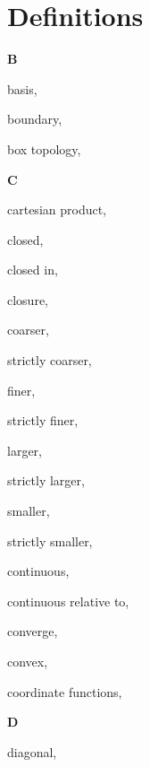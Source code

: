 \section*{Definitions}

\begin{multicols}{2}

\vspace{1em}\noindent\large{\textbf{B}}

basis, \pageref{def:Basis}

boundary, \pageref{def:Boundary}

box topology, \pageref{def:BoxTopology}

\vspace{1em}\noindent\large{\textbf{C}}

cartesian product, \pageref{def:CartesianProduct}

closed, \pageref{def:Closed}

\hspace{1em}closed in, \pageref{def:ClosedIn}

closure, \pageref{def:Closure}

coarser, \pageref{def:Comparable}

\hspace{1em}strictly coarser, \pageref{def:Comparable}

finer, \pageref{def:Comparable}

\hspace{1em}strictly finer, \pageref{def:Comparable}

larger, \pageref{def:Comparable}

\hspace{1em}strictly larger, \pageref{def:Comparable}

smaller, \pageref{def:Comparable}

\hspace{1em}strictly smaller, \pageref{def:Comparable}

continuous, \pageref{def:Continuous}

\hspace{1em}continuous relative to, \pageref{def:ContinuousRelativeTo}

converge, \pageref{def:Converge}

convex, \pageref{def:Convex}

coordinate functions, \pageref{def:CoordinateFunctions}

\vspace{1em}\noindent\large{\textbf{D}}

diagonal, \pageref{def:Diagonal}


\end{multicols}
